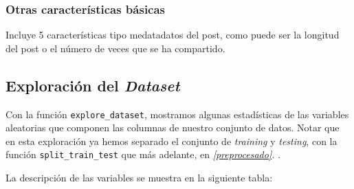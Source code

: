 \documentclass[11pt]{article}
\begin{document}
\subsubsection{Otras características básicas}

Incluye 5 características tipo medatadatos del post, como puede ser la longitud del post o el número de veces que se ha compartido.

\subsection{Exploración del \emph{Dataset}} \label{exploracion_datos}

Con la función \lstinline{explore_dataset}, mostramos algunas estadísticas de las variables aleatorias que componen las columnas de nuestro conjunto de datos. Notar que en esta exploración ya hemos separado el conjunto de \emph{training} y \emph{testing}, con la función \lstinline{split_train_test} que más adelante, en \emph{\ref{preprocesado}. }.

La descripción de las variables se muestra en la siguiente tabla:
\end{document}
